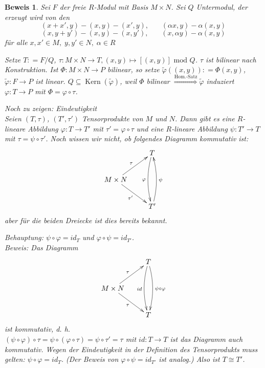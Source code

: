 \documentclass[a4paper,12pt]{scrbook}
\theoremstyle{break}
\newtheorem{anBew}[Def]{Beweis}
\theoremstyle{nonumberbreak}
\theoremstyle{nonumberplain}
\newcommand{\defeqr}[0]{\mathrel{\mathop:}=}
\DeclareMathOperator{\Kern}{Kern}
\begin{document}
\begin{anBew}
  Sei $F$ der freie $R$-Modul mit Basis $M \times N$.
  Sei $Q$ Untermodul, der erzeugt wird von den \[(x + x',y) - (x,y) - (x',y),\ \ \ \ \ \ \ \ 
  (\alpha x,y) - \alpha (x,y)\] \[(x,y + y') - (x,y) - (x,y'),\ \ \ \ \ \ \ \ 
  (x,\alpha y) - \alpha (x,y)\] für alle $x,x' \in M,\; y,y' \in N,\;\alpha \in
  R$

  Setze $T \defeqr F/Q$, $\tau: M \times N \to T, (x,y) \mapsto [(x,y)]
  \mbox{ mod } Q$. $\tau$ ist bilinear nach Konstruktion.
  Ist $\Phi: M \times N \to P$ bilinear, so setze $\tilde{\varphi}((x,y))
  \defeqr \Phi(x,y)$, $\tilde{\varphi}: F \to P$ ist linear. $Q \subseteq
  \Kern(\tilde{\varphi})$, weil $\Phi$ bilinear $\overset{\text{Hom.-Satz}}{\Rightarrow}
  \tilde{\varphi}$ induziert $\varphi: T \to P$ mit $\Phi = \varphi \circ \tau$.

  Noch zu zeigen: Eindeutigkeit\\
  Seien $(T, \tau)$, $(T', \tau')$ Tensorprodukte von $M$ und $N$. Dann gibt es eine $R$-lineare 
  Abbildung $\varphi: T \rightarrow T'$ mit $\tau'= \varphi \circ \tau$
  und eine $R$-lineare Abbildung $\psi: T' \rightarrow T$ mit $\tau = \psi \circ\tau'$. Noch wissen
  wir nicht, ob folgendes Diagramm kommutativ ist:
  \[\begin{xy}
      \xymatrix{
                                                  & T \ar@/_/[dd]_{\varphi} \\
        M \times N \ar[ur]^{\tau} \ar[dr]_{\tau'} &                     \\
                                                  & T' \ar@/_/[uu]_{\psi}
      }
    \end{xy}\]
   aber für die beiden Dreiecke ist dies bereits bekannt. 

  Behauptung: $\psi \circ \varphi = id_T$ und $\varphi \circ \psi = id_{T'}$.\\
  Beweis: Das Diagramm
  \[\begin{xy}
      \xymatrix{
                                                 & T \ar@/_/[dd]_{id}
                                                 \ar@/^/[dd]^{\psi \circ \varphi} \\
        M \times N \ar[ur]^{\tau} \ar[dr]_{\tau} &                     \\
                                                 & T
      }
    \end{xy}\]
  ist kommutativ, d. h.\\
  $(\psi \circ \varphi ) \circ \tau = \psi \circ ( \varphi \circ \tau) = \psi \circ \tau' = \tau$
  mit $id: T \rightarrow T$ ist das Diagramm auch kommutativ. Wegen der Eindeutigkeit in der 
  Definition des Tensorprodukts muss gelten: $\psi \circ \varphi = id_T$.
  (Der Beweis von $\varphi \circ \psi = id_{T'}$ ist analog.) Also ist $T \cong T'$.
\end{anBew}
\end{document}
